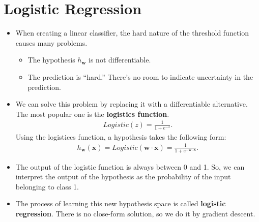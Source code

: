 \documentclass[10pt]{article}
\begin{document}
\section{Logistic Regression}
\begin{itemize}
    \item When creating a linear classifier, the hard nature
        of the threshold function causes many problems.
        \begin{itemize}
            \item The hypothesis $h_\mathbf{w}$ is not 
                differentiable.
            \item The prediction is ``hard.'' There's no
                room to indicate uncertainty in the prediction.
        \end{itemize}
        
    \item We can solve this problem by replacing it with
        a differentiable alternative. The most popular one
        is the {\bf logistics function}.
        \begin{align*}
            Logistic(z) = \frac{1}{1+e^{-z}}.
        \end{align*}
        Using the logisticcs function, a hypothesis takes
        the following form:
        \begin{align*}
            h_{\mathbf{w}}(\mathbf{x}) 
            = Logistic(\mathbf{w}\cdot\mathbf{x})
            = \frac{1}{1 + e^{-\mathbf{w}\cdot\mathbf{x}}}.
        \end{align*}
        
    \item The output of the logistic function is always 
        between 0 and 1. So, we can interpret the output
        of the hypothesis as the probability of the input
        belonging to class 1.
    
    \item The process of learning this new hypothesis space
        is called {\bf logistic regression}. There is no
        close-form solution, so we do it by gradient descent.
        

\end{itemize}
\end{document}

